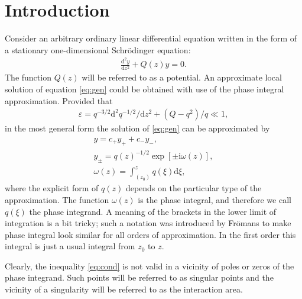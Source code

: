\documentclass[aip,jmp,reprint]{revtex4-1}
\def\rmi{\mathrm{i}}
\def\rmd{\mathrm{d}}
\def\w{\omega}
\newcommand\phsintgrnd[1][z]{q(#1)}
\newcommand\predexp[1][z]{q(#1)^{-1/2}}
\newcommand\phsintgrl[3][z]{\int_{#2}^{#3} \phsintgrnd[#1] \rmd #1}
\begin{document}
\section{Introduction \label{sec:intro}}
Consider an arbitrary ordinary linear differential equation written in the form of 
a stationary one-dimensional Schr\"odinger equation:
\begin{eqnarray}
\frac{\rmd^2 y}{\rmd z^2} + Q(z)y = 0.   \label{eq:gen}
\end{eqnarray}
The function $Q(z)$ will be referred to as a potential. An approximate local solution 
of equation \eqref{eq:gen} could be obtained with use of the phase integral approximation\cite{frbook}. 
Provided that 
\begin{eqnarray}
\varepsilon = q^{-3/2} \rmd^2 q^{-1/2}/\rmd z^2  + (Q - q^2)/q \ll 1,   \label{eq:cond}
\end{eqnarray}
in the most general form the solution of \eqref{eq:gen} can be approximated by
\begin{subequations}
\begin{eqnarray}
y = c_+y_+ + c_-y_-, \label{eq:gensol}
\\
y_\pm = \predexp \exp [\pm \rmi \w(z)], \label{eq:phsint}
\\
\w(z)=\phsintgrl[\xi]{(z_0)}{z},
\end{eqnarray}
\end{subequations}
where the explicit form of $q(z)$ depends on the particular type of the approximation.
The function $\w(z)$ is the phase integral, and therefore we call $\phsintgrnd[\xi]$ 
the phase integrand. A meaning of the brackets in the lower limit of integration is a 
bit tricky; such a notation was introduced by Fr\"omans \cite{frpaper} to make
phase integral look similar for all orders of approximation. In the first order this integral 
is just a usual integral from $z_0$ to $z$. 

Clearly, the inequality \eqref{eq:cond} is not valid in a vicinity of poles or zeros of 
the phase integrand. Such points will be referred to as singular points and the 
vicinity of a singularity will be referred to as the interaction area.
\end{document}
